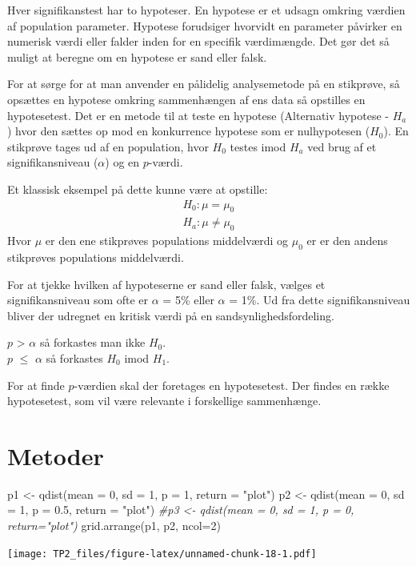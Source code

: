 \documentclass[
]{article}
\newenvironment{Shaded}{\begin{snugshade}}{\end{snugshade}}
\newcommand{\AttributeTok}[1]{\textcolor[rgb]{0.77,0.63,0.00}{#1}}
\newcommand{\CommentTok}[1]{\textcolor[rgb]{0.56,0.35,0.01}{\textit{#1}}}
\newcommand{\DecValTok}[1]{\textcolor[rgb]{0.00,0.00,0.81}{#1}}
\newcommand{\FloatTok}[1]{\textcolor[rgb]{0.00,0.00,0.81}{#1}}
\newcommand{\FunctionTok}[1]{\textcolor[rgb]{0.00,0.00,0.00}{#1}}
\newcommand{\NormalTok}[1]{#1}
\newcommand{\OtherTok}[1]{\textcolor[rgb]{0.56,0.35,0.01}{#1}}
\newcommand{\StringTok}[1]{\textcolor[rgb]{0.31,0.60,0.02}{#1}}
\begin{document}
Hver signifikanstest har to hypoteser. En hypotese er et udsagn omkring
værdien af population parameter. Hypotese forudsiger hvorvidt en
parameter påvirker en numerisk værdi eller falder inden for en specifik
værdimængde. Det gør det så muligt at beregne om en hypotese er sand
eller falsk.

For at sørge for at man anvender en pålidelig analysemetode på en
stikprøve, så opsættes en hypotese omkring sammenhængen af ens data så
opstilles en hypotesetest. Det er en metode til at teste en hypotese
(Alternativ hypotese - \(H_a\)) hvor den sættes op mod en konkurrence
hypotese som er nulhypotesen (\(H_0\)). En stikprøve tages ud af en
population, hvor \(H_0\) testes imod \(H_a\) ved brug af et
signifikansniveau (\(\alpha\)) og en \(p\)-værdi.

Et klassisk eksempel på dette kunne være at opstille: \[
\begin{aligned}
H_0 : \mu = \mu_0
\\
H_a : \mu \not= \mu_0
\end{aligned}
\] Hvor \(\mu\) er den ene stikprøves populations middelværdi og
\(\mu_0\) er er den andens stikprøves populations middelværdi.

For at tjekke hvilken af hypoteserne er sand eller falsk, vælges et
signifikansniveau som ofte er \(\alpha\) = 5\% eller \(\alpha\) = 1\%.
Ud fra dette signifikansniveau bliver der udregnet en kritisk værdi på
en sandsynlighedsfordeling.

\(p\) \textgreater{} \(\alpha\) så forkastes man ikke \(H_0\).\\
\(p\) \(\le\) \(\alpha\) så forkastes \(H_0\) imod \(H_1\).

For at finde \(p\)-værdien skal der foretages en hypotesetest. Der
findes en række hypotesetest, som vil være relevante i forskellige
sammenhænge.

\hypertarget{metoder}{%
\section{Metoder}\label{metoder}}

\begin{Shaded}
\begin{Highlighting}[]
\NormalTok{p1 }\OtherTok{\textless{}{-}} \FunctionTok{qdist}\NormalTok{(}\AttributeTok{mean =} \DecValTok{0}\NormalTok{, }\AttributeTok{sd =} \DecValTok{1}\NormalTok{, }\AttributeTok{p =} \DecValTok{1}\NormalTok{, }\AttributeTok{return =} \StringTok{"plot"}\NormalTok{)}
\NormalTok{p2 }\OtherTok{\textless{}{-}} \FunctionTok{qdist}\NormalTok{(}\AttributeTok{mean =} \DecValTok{0}\NormalTok{, }\AttributeTok{sd =} \DecValTok{1}\NormalTok{, }\AttributeTok{p =} \FloatTok{0.5}\NormalTok{, }\AttributeTok{return =} \StringTok{"plot"}\NormalTok{)}
\CommentTok{\#p3 \textless{}{-} qdist(mean = 0, sd = 1, p = 0, return="plot")}
\FunctionTok{grid.arrange}\NormalTok{(p1, p2, }\AttributeTok{ncol=}\DecValTok{2}\NormalTok{)}
\end{Highlighting}
\end{Shaded}

\texttt{[image: TP2\_files/figure-latex/unnamed-chunk-18-1.pdf]}
\end{document}
